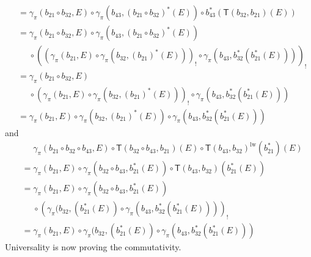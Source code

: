 \begin{enumerate}
\begin{enumerate}
\begin{align*}
  &=
  \gamma_{\pi}(b_{21} \circ b_{32},E)
  \circ
  \gamma_{\pi}
  \left(
    b_{43},
    (b_{21} \circ b_{32})^{\ast}(E)
  \right)
  \circ
  b_{43}^{\ast}
  \left(
    \mathsf{T}(b_{32},b_{21})(E)
  \right)
  \\
  &=
  \gamma_{\pi}(b_{21} \circ b_{32},E)
  \circ
  \gamma_{\pi}
  \left(
    b_{43},
    (b_{21} \circ b_{32})^{\ast}(E)
  \right)
  \\
  &\phantom{=}
  \circ
  \left(
    \left(
      \gamma_{\pi}(b_{21},E)
      \circ
      \gamma_{\pi}
      \left(
        b_{32},
        (b_{21})^{\ast}(E)
      \right)
    \right)_{!}
    \circ
    \gamma_{\pi}
    \left(
      b_{43},
      b_{32}^{\ast}
      \left(
        b_{21}^{\ast}(E)
      \right)
    \right)
  \right)_{!}
  \\
  &=
  \gamma_{\pi}(b_{21} \circ b_{32},E)
  \\
  &\phantom{=}
  \circ
  \left(
    \gamma_{\pi}(b_{21},E)
    \circ
    \gamma_{\pi}
    \left(
      b_{32},
      (b_{21})^{\ast}(E)
    \right)
  \right)_{!}
  \circ
  \gamma_{\pi}
  \left(
    b_{43},
    b_{32}^{\ast}
    \left(
      b_{21}^{\ast}(E)
    \right)
  \right)
  \\
  &=
  \gamma_{\pi}(b_{21},E)
  \circ
  \gamma_{\pi}
  \left(
    b_{32},
    (b_{21})^{\ast}(E)
  \right)
  \circ
  \gamma_{\pi}
  \left(
    b_{43},
    b_{32}^{\ast}
    \left(
      b_{21}^{\ast}(E)
    \right)
  \right)
\end{align*}
and
\begin{align*}
  &\phantom{=}
  \gamma_{\pi}(b_{21} \circ b_{32} \circ b_{43},E)
  \circ
  \mathsf{T}(b_{32} \circ b_{43},b_{21})(E)
  \circ
  \mathsf{T}(b_{43},b_{32})^{\mathrm{lw}}(b_{21}^{\ast})
  (E)
  \\
  &=
  \gamma_{\pi}(b_{21},E)
  \circ
  \gamma_{\pi}
  \left(
    b_{32}
    \circ
    b_{43},
    b_{21}^{\ast}(E)
  \right)
  \circ
  \mathsf{T}(b_{43},b_{32})(b_{21}^{\ast}(E))
  \\
  &=
  \gamma_{\pi}(b_{21},E)
  \circ
  \gamma_{\pi}
  \left(
    b_{32}
    \circ
    b_{43},
    b_{21}^{\ast}(E)
  \right)
  \\
  &\phantom{=}
  \circ
  \left(
    \gamma_{\pi}(b_{32},(b_{21}^{\ast}(E))
    \circ
    \gamma_{\pi}
    \left(
      b_{43},
      b_{32}^{\ast}
      \left(
        b_{21}^{\ast}(E)
      \right)
    \right)
  \right)_{!}
  \\
  &=
  \gamma_{\pi}(b_{21},E)
  \circ
  \gamma_{\pi}(b_{32},(b_{21}^{\ast}(E))
  \circ
  \gamma_{\pi}
  \left(
    b_{43},
    b_{32}^{\ast}
    \left(
      b_{21}^{\ast}(E)
    \right)
  \right)
\end{align*}
Universality is now proving the commutativity.
\end{enumerate}
\end{enumerate}
